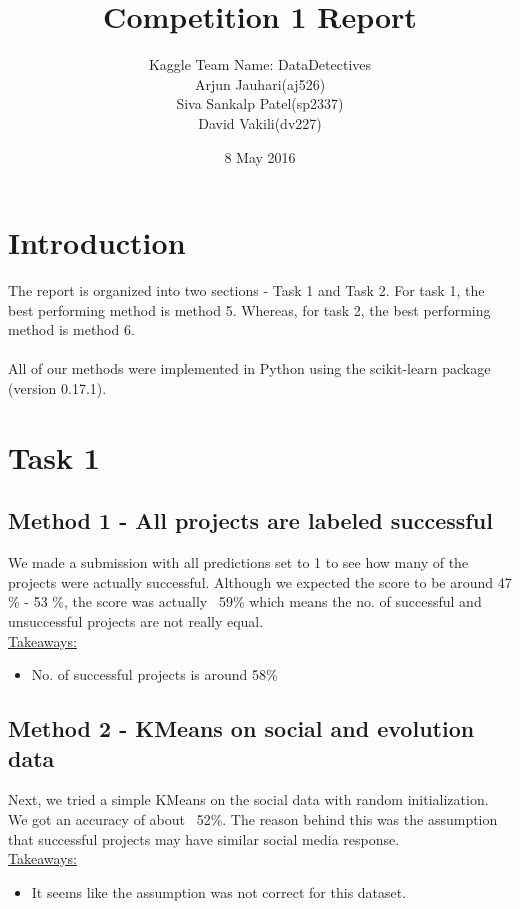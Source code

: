 \documentclass{article}
\title{Competition 1 Report}
\author{Kaggle Team Name: DataDetectives \\ Arjun Jauhari(aj526) \\ Siva Sankalp Patel(sp2337) \\ David Vakili(dv227)}
\date{8 May 2016}
\begin{document}
\maketitle

\section*{Introduction}
The report is organized into two sections - Task 1 and Task 2. For task 1, the best performing method is method 5. Whereas, for task 2, the best performing method is method 6. \\
\\
All of our methods were implemented in Python using the scikit-learn package (version 0.17.1). 
 \\

\section*{Task 1}
\subsection*{Method 1 - All projects are labeled successful}
We made a submission with all predictions set to 1 to see how many of the projects were actually successful. Although we expected the score to be around 47 \% - 53 \%, the score was actually ~59\% which means the no. of successful and unsuccessful projects are not really equal. \\
\underline{Takeaways:}\\
\vspace{-0.5cm}
\begin{itemize}
\item No. of successful projects is around 58\%
\end{itemize}
\subsection*{Method 2 - KMeans on social and evolution data}
Next, we tried a simple KMeans on the social data with random initialization. We got an accuracy of about ~52\%. The reason behind this was the assumption that successful projects may have similar social media response. \\
\underline{Takeaways:}\\
\vspace{-0.5cm}
\begin{itemize}
\item It seems like the assumption was not correct for this dataset.
\end{itemize}
\end{document}
